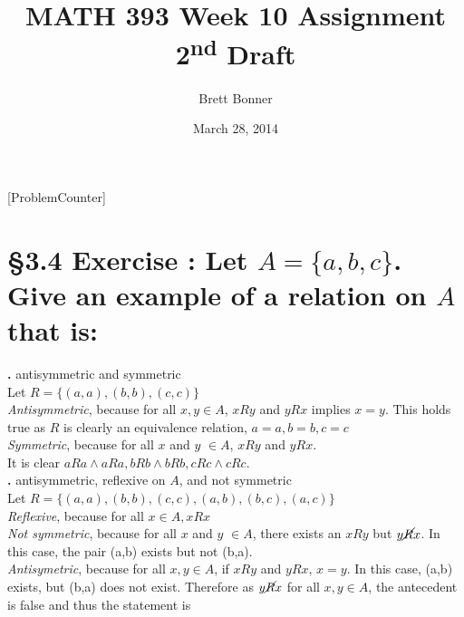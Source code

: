 \documentclass[a4paper,11pt]{article}
\begin{document}
\newtheorem*{theorem1}{Theorem}
\newtheorem*{theorem2}{Theorem}
\newtheorem*{theorem3}{Theorem}
\newtheorem*{theorem4}{Theorem}
\newtheorem*{theorem5}{Theorem}
\newtheorem*{theorem6}{Theorem}
\newtheorem*{theorem7}{Theorem}
\newtheorem*{theorem8}{Theorem}
\newtheorem*{theorem9}{True/False?}
\title{MATH 393 Week 10 Assignment 2\textsuperscript{nd} Draft}
\author{Brett Bonner}
\date{March 28, 2014}
\maketitle
\doublespacing
{}
[ProblemCounter]
\addtocounter{ProblemCounter}{6} %
\addtocounter{SubsectionCounter}{3} %
%

\setcounter{ProblemCounter}{2}
\section*{\S 3.4 Exercise : Let \(A=\{a,b,c\}\). Give an example of a relation on \(A\) that is:}
\setcounter{SubsectionCounter}{1}
\textbf{.}
  antisymmetric and symmetric\\
  Let \(R = \{{(a,a),{(b,b)},{(c,c)}}\}\)\\
  \textit{Antisymmetric}, because for all \(x,y \in A\), \(xRy\) and \(yRx\) implies \(x=y\). This holds true as \(R\) is clearly an equivalence relation, \(a=a, b=b, c=c\)\\
  \textit{Symmetric}, because for all \(x\) and \(y\) \(\in A\), \(xRy\) and \(yRx\).\\ It is clear \(aRa \wedge aRa, bRb \wedge bRb, cRc \wedge cRc\).\\
\setcounter{SubsectionCounter}{2}
\textbf{.}
  antisymmetric, reflexive on \(A\), and not symmetric\\
  Let \(R = \{{(a,a),(b,b),(c,c),(a,b),{(b,c)},{(a,c)}}\}\)\\
  \textit{Reflexive}, because for all \(x \in A, xRx\)\\
  \textit{Not symmetric}, because for all \(x\) and \(y\) \(\in A\), there exists an \(xRy\) but \(y\cancel{R}x\). In this case, the pair {(a,b)} exists but not {(b,a)}.\\
  \textit{Antisymetric}, because for all \(x,y \in A\), if \(xRy\) and \(y R x\), \(x=y\). In this case, {(a,b)} exists, but (b,a) does not exist. Therefore as \(y \cancel{R} x\) for all \(x,y \in A\), the antecedent is false and thus the statement is 
\end{document}
